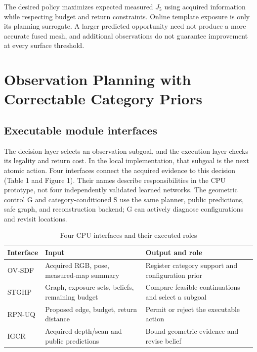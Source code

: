 \documentclass[pdflatex,sn-mathphys-num]{sn-jnl}
\newlength{\JournalTableWidth}
\begin{document}
The desired policy maximizes expected measured \(J_5\) using acquired information while respecting budget and return constraints. Online template exposure is only its planning surrogate. A larger predicted opportunity need not produce a more accurate fused mesh, and additional observations do not guarantee improvement at every surface threshold.

\hypertarget{observation-planning-with-correctable-category-priors}{%
\section{Observation Planning with Correctable Category Priors}\label{observation-planning-with-correctable-category-priors}}

\hypertarget{executable-module-interfaces}{%
\subsection{Executable module interfaces}\label{executable-module-interfaces}}

The decision layer selects an observation subgoal, and the execution layer checks its legality and return cost. In the local implementation, that subgoal is the next atomic action. Four interfaces connect the acquired evidence to this decision (Table 1 and Figure 1). Their names describe responsibilities in the CPU prototype, not four independently validated learned networks. The geometric control G and category-conditioned S use the same planner, public predictions, safe graph, and reconstruction backend; G can actively diagnose configurations and revisit locations.

\begin{table}[!htbp]
\caption{Four CPU interfaces and their executed roles}\label{tab:1}
\small\setlength{\tabcolsep}{3pt}
\setlength{\JournalTableWidth}{\dimexpr\linewidth-4\tabcolsep\relax}
\begin{tabular}{@{}>{\raggedright\arraybackslash}p{0.16\JournalTableWidth} >{\raggedright\arraybackslash}p{0.32\JournalTableWidth} >{\raggedright\arraybackslash}p{0.52\JournalTableWidth}@{}}
\toprule
Interface & Input & Output and role \\
\midrule
OV-SDF & Acquired RGB, pose, measured-map summary & Register category support and configuration prior \\
STGHP & Graph, exposure sets, beliefs, remaining budget & Compare feasible continuations and select a subgoal \\
RPN-UQ & Proposed edge, budget, return distance & Permit or reject the executable action \\
IGCR & Acquired depth/scan and public predictions & Bound geometric evidence and revise belief \\
\bottomrule
\end{tabular}
\end{table}
\end{document}
